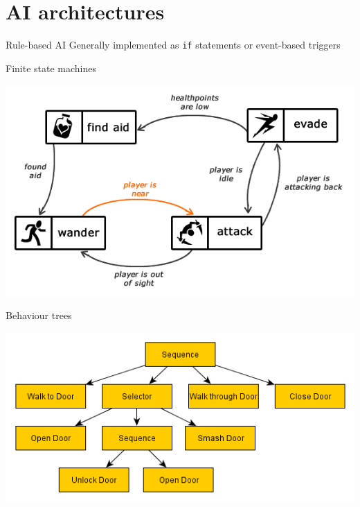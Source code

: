 \part{AI architectures}
\frame{\partpage}

\begin{frame}{Rule-based AI}
	Generally implemented as \texttt{if} statements or event-based triggers
\end{frame}

\begin{frame}{Finite state machines}
	\begin{center}
		\includegraphics[width=\textwidth]{fsm_enemy_brain}
	\end{center}
\end{frame}

\begin{frame}{Behaviour trees}
	\begin{center}
		\includegraphics[width=\textwidth]{behaviour_tree}
	\end{center}
\end{frame}

